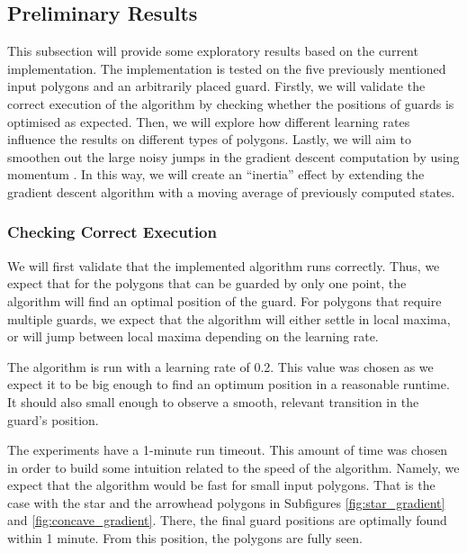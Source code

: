 \subsection{Preliminary Results}
This subsection will provide some exploratory results based on the current implementation. The implementation is tested on the five previously mentioned input polygons and an arbitrarily placed guard. Firstly, we will validate the correct execution of the algorithm by checking whether the positions of guards is optimised as expected. Then, we will explore how different learning rates influence the results on different types of polygons. Lastly, we will aim to smoothen out the large noisy jumps in the gradient descent computation by using momentum \cite{goodfelow2016deep}. In this way, we will create an ``inertia'' effect by extending the gradient descent algorithm with a moving average of previously computed states.

\subsubsection{Checking Correct Execution}
We will first validate that the implemented algorithm runs correctly. Thus, we expect that for the polygons that can be guarded by only one point, the algorithm will find an optimal position of the guard. For polygons that require multiple guards, we expect that the algorithm will either settle in local maxima, or will jump between local maxima depending on the learning rate.

The algorithm is run with a learning rate of 0.2. This value was chosen as we expect it to be big enough to find an optimum position in a reasonable runtime. It should also small enough to observe a smooth, relevant transition in the guard's position.

The experiments have a 1-minute run timeout. This amount of time was chosen in order to build some intuition related to the speed of the algorithm. Namely, we expect that the algorithm would be fast for small input polygons. That is the case with the star and the arrowhead polygons in Subfigures \ref{fig:star_gradient} and \ref{fig:concave_gradient}. There, the final guard positions are optimally found within 1 minute. From this position, the polygons are fully seen.


